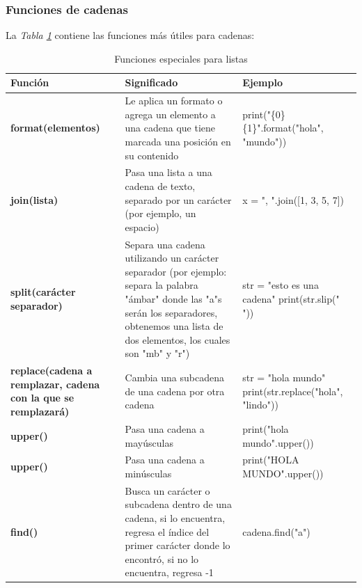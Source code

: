 \subsubsection{Funciones de cadenas}
\hspace{0.55cm}La \textit{Tabla \ref{tab: 5}} contiene las funciones más útiles para cadenas:
\begin{table}[H]
    \begin{center}
        \caption{Funciones especiales para listas}
        \label{tab: 5}
        \begin{tabular}{m{4cm}|m{4cm}|m{4cm}}
            \hline
            \textbf{Función} & \textbf{Significado} & \textbf{Ejemplo} \\
            \hline
            \textbf{format(elementos)}											& Le aplica un formato o agrega un elemento a una cadena que tiene marcada una posición en su contenido				& print("\{0\} \{1\}".format("hola", "mundo")) \\
            \textbf{join(lista)}													& Pasa una lista a una cadena de texto, separado por un carácter (por ejemplo, un espacio)						& x = ", ".join([1, 3, 5, 7]) \\
            \textbf{split(carácter separador)}									& Separa una cadena utilizando un carácter separador (por ejemplo: separa la palabra "ámbar" donde las "a"s serán los separadores, obtenemos una lista de dos elementos, los cuales son "mb" y "r")																						& str = "esto es una cadena" print(str.slip(" ")) \\
            \textbf{replace(cadena a remplazar, cadena con la que se remplazará)}	& Cambia una subcadena de una cadena por otra cadena																		& str = "hola mundo" print(str.replace("hola", "lindo")) \\
            \textbf{upper()}														& Pasa una cadena a mayúsculas																							& print("hola mundo".upper()) \\
            \textbf{upper()}														& Pasa una cadena a minúsculas																							& print("HOLA MUNDO".upper()) \\
            \textbf{find()}														& Busca un carácter o subcadena dentro de una cadena, si lo encuentra, regresa el índice del primer carácter donde lo encontró, si no lo encuentra, regresa -1																													& cadena.find("a") \\
            \hline
        \end{tabular}
    \end{center}    
\end{table}



